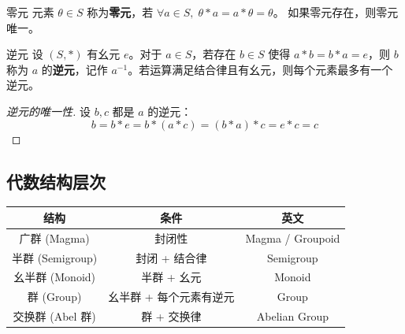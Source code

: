 \begin{mydefinition}{零元}
元素 $\theta \in S$ 称为\textbf{零元}，若 $\forall a \in S,\; \theta*a = a*\theta = \theta$。
如果零元存在，则零元唯一。
\end{mydefinition}

\begin{mydefinition}{逆元}
设 $(S,*)$ 有幺元 $e$。对于 $a \in S$，若存在 $b \in S$ 使得 $a*b = b*a = e$，则 $b$ 称为 $a$ 的\textbf{逆元}，记作 $a^{-1}$。若运算满足结合律且有幺元，则每个元素最多有一个逆元。
\end{mydefinition}

\begin{proof}[逆元的唯一性]
设 $b, c$ 都是 $a$ 的逆元：
\[
b = b*e = b*(a*c) = (b*a)*c = e*c = c
\]
\end{proof}

\subsection{代数结构层次}

\begin{center}
\begin{tabular}{c|c|c}
\hline
\textbf{结构} & \textbf{条件} & \textbf{英文} \\
\hline
广群 (Magma)    & 封闭性 & Magma / Groupoid \\
半群 (Semigroup) & 封闭 + 结合律 & Semigroup \\
幺半群 (Monoid)   & 半群 + 幺元 & Monoid \\
群 (Group)       & 幺半群 + 每个元素有逆元 & Group \\
交换群 (Abel 群)  & 群 + 交换律 & Abelian Group \\
\hline
\end{tabular}
\end{center}

